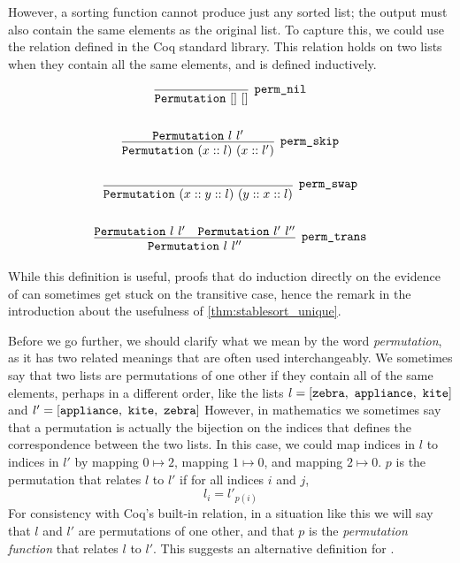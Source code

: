 \documentclass[sigplan,10pt,anonymous,review]{thesis}
\begin{document}
However, a sorting function cannot produce just any sorted list; the
output must also contain the same elements as the original list. To
capture this, we could use the  relation defined in
the Coq standard library. This relation holds on two lists when they
contain all the same elements, and is defined inductively.
\begin{definition}[Permutation]
  \label{def:permutation}
  \begin{gather*}
    \infer[\var{perm\_nil}]{\var{Permutation}~[]~[]}{}
    \\
    \allowbreak
    \\
    \infer[\var{perm\_skip}]{\var{Permutation}~(x :: l)~(x :: l')}{%
      \var{Permutation}~l~l'
    }
    \\
    \allowbreak
    \\
    \infer[\var{perm\_swap}]{\var{Permutation}~(x :: y :: l)~(y :: x :: l)}{}
    \\
    \allowbreak
    \\
    \infer[\var{perm\_trans}]{\var{Permutation}~l~l''}{
      \var{Permutation}~l~l' & \var{Permutation}~l'~l''
    }
  \end{gather*}
\end{definition}
While this definition is useful, proofs that do induction directly on
the evidence of  can sometimes get stuck on the
transitive case, hence the remark in the introduction about the
usefulness of \cref{thm:stablesort_unique}.

Before we go further, we should clarify what we mean by the word
\textit{permutation}, as it has two related meanings that are often
used interchangeably. We sometimes say that two lists are permutations
of one other if they contain all of the same elements, perhaps in a
different order, like the lists $l =
[\texttt{\textup{zebra}},\ \allowbreak\texttt{\textup{appliance}},\ \allowbreak\texttt{\textup{kite}}]$
and $l' =
[\texttt{\textup{appliance}},\ \allowbreak\texttt{\textup{kite}},\ \allowbreak\texttt{\textup{zebra}}]$
However, in mathematics we sometimes say that a permutation is
actually the bijection on the indices that defines the correspondence
between the two lists. In this case, we could map indices in $l$ to
indices in $l'$ by mapping $0 \mapsto 2$, mapping $1 \mapsto 0$, and mapping $2 \mapsto
0$. $p$ is the permutation that relates $l$ to $l'$ if for all indices
$i$ and $j$,
\begin{equation*}
  l_i = l'_{p(i)}
\end{equation*}
For consistency with Coq's built-in  relation, in a
situation like this we will say that $l$ and $l'$ are permutations of
one other, and that $p$ is the \textit{permutation function} that
relates $l$ to $l'$. This suggests an alternative definition for
.
\end{document}
